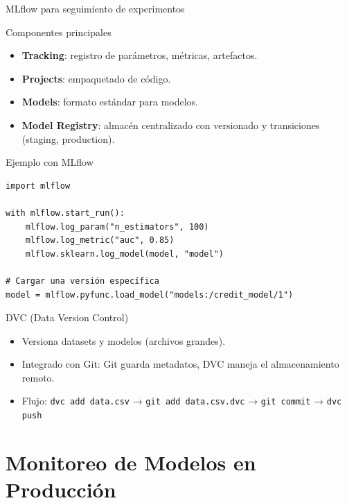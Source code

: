 \documentclass[aspectratio=169, 10pt, xcolor=table]{beamer}
\begin{document}
\begin{frame}{MLflow para seguimiento de experimentos}
    \begin{block}{Componentes principales}
        \begin{itemize}
            \item \textbf{Tracking}: registro de parámetros, métricas, artefactos.
            \item \textbf{Projects}: empaquetado de código.
            \item \textbf{Models}: formato estándar para modelos.
            \item \textbf{Model Registry}: almacén centralizado con versionado y transiciones (staging, production).
        \end{itemize}
    \end{block}
\end{frame}

\begin{frame}[fragile]{Ejemplo con MLflow}
    \begin{lstlisting}
import mlflow

with mlflow.start_run():
    mlflow.log_param("n_estimators", 100)
    mlflow.log_metric("auc", 0.85)
    mlflow.sklearn.log_model(model, "model")

# Cargar una versión específica
model = mlflow.pyfunc.load_model("models:/credit_model/1")
    \end{lstlisting}
\end{frame}

\begin{frame}{DVC (Data Version Control)}
    \begin{itemize}
        \item Versiona datasets y modelos (archivos grandes).
        \item Integrado con Git: Git guarda metadatos, DVC maneja el almacenamiento remoto.
        \item Flujo: \texttt{dvc add data.csv} → \texttt{git add data.csv.dvc} → \texttt{git commit} → \texttt{dvc push}
    \end{itemize}
\end{frame}

\section{Monitoreo de Modelos en Producción}
\end{document}
